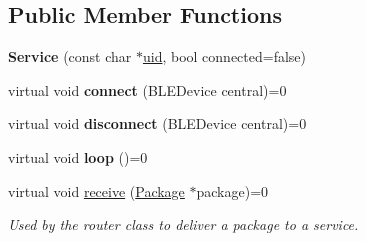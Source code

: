 \subsection*{Public Member Functions}
\begin{DoxyCompactItemize}
\item 
{\bfseries Service} (const char $\ast$\hyperlink{class_bottle_buddy_1_1_embedded_1_1_pipeline_1_1_service_af290f9aa0a6dca36e802e615fab19f78}{uid}, bool connected=false)\hypertarget{class_bottle_buddy_1_1_embedded_1_1_pipeline_1_1_service_a8381de83d01e2c167746b1c8bc698552}{}\label{class_bottle_buddy_1_1_embedded_1_1_pipeline_1_1_service_a8381de83d01e2c167746b1c8bc698552}

\item 
virtual void {\bfseries connect} (B\+L\+E\+Device central)=0\hypertarget{class_bottle_buddy_1_1_embedded_1_1_pipeline_1_1_service_a9255768adea0f606df15d4e991bc88cf}{}\label{class_bottle_buddy_1_1_embedded_1_1_pipeline_1_1_service_a9255768adea0f606df15d4e991bc88cf}

\item 
virtual void {\bfseries disconnect} (B\+L\+E\+Device central)=0\hypertarget{class_bottle_buddy_1_1_embedded_1_1_pipeline_1_1_service_a151d906c9cbbac783c74fb6c8f17ffcc}{}\label{class_bottle_buddy_1_1_embedded_1_1_pipeline_1_1_service_a151d906c9cbbac783c74fb6c8f17ffcc}

\item 
virtual void {\bfseries loop} ()=0\hypertarget{class_bottle_buddy_1_1_embedded_1_1_pipeline_1_1_service_ab2e3087822ea3768ce176b64b43ec706}{}\label{class_bottle_buddy_1_1_embedded_1_1_pipeline_1_1_service_ab2e3087822ea3768ce176b64b43ec706}

\item 
virtual void \hyperlink{class_bottle_buddy_1_1_embedded_1_1_pipeline_1_1_service_aaa0ee18450e47f2ad51d9934a2d61992}{receive} (\hyperlink{class_bottle_buddy_1_1_embedded_1_1_pipeline_1_1_package}{Package} $\ast$package)=0
\begin{DoxyCompactList}\small\item\em Used by the router class to deliver a package to a service. \end{DoxyCompactList}\end{DoxyCompactItemize}
